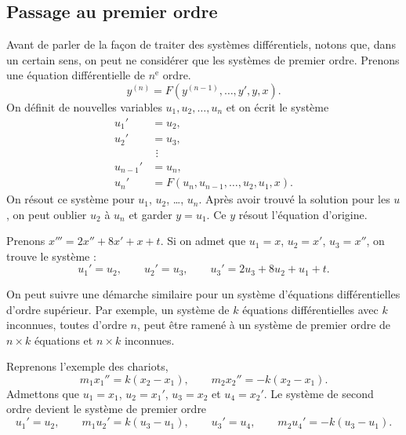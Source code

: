 \subsection{Passage au premier ordre}

Avant de parler de la façon de traiter des systèmes différentiels, notons que, dans un certain sens, on peut ne considérer que les systèmes de premier ordre. Prenons une équation différentielle de $n^{\text{e}}$ ordre.
\begin{equation*}
y^{(n)} = F(y^{(n-1)},\ldots,y',y,x) .
\end{equation*}
On définit de nouvelles variables $u_1, u_2, \ldots, u_n$ et on écrit le système
\begin{align*}
u_1' & = u_2 , \\
u_2' & = u_3 , \\
& ~\, \vdots \\
u_{n-1}' & = u_n , \\
u_n' & = F(u_n,u_{n-1},\ldots,u_2,u_1,x) .
\end{align*}
On résout ce système pour $u_1$, $u_2$, \ldots, $u_n$.  Après avoir trouvé la solution pour les $u$,
on peut oublier $u_2$ à $u_n$ et garder $y = u_1$.
Ce $y$ résout l'équation d'origine.

\begin{example}
Prenons $x''' = 2x''+ 8x' + x + t$.  Si on admet que $u_1 = x$, $u_2 = x'$, $u_3
= x''$, on trouve le système :
\begin{equation*}
u_1' = u_2, \qquad u_2' = u_3, \qquad u_3' = 2u_3 + 8u_2 + u_1 + t .
\end{equation*}
\end{example}

On peut suivre une démarche similaire pour un système d'équations différentielles d'ordre supérieur. Par exemple, un système de $k$ équations différentielles avec $k$
inconnues, toutes d’ordre $n$, peut être ramené à un système de premier ordre de 
$n \times k$
équations et $n \times k$ inconnues.

\begin{example}
Reprenons l’exemple des chariots,
\begin{equation*}
m_1 x_1''  = k(x_2-x_1), \qquad m_2 x_2'' = - k(x_2-x_1) .
\end{equation*}
Admettons que $u_1 = x_1$, $u_2 = x_1'$, 
$u_3 = x_2$ et $u_4 = x_2'$. Le système de second ordre devient le système de premier ordre
\begin{equation*}
u_1' = u_2, \qquad
m_1 u_2'  = k(u_3-u_1), \qquad
u_3' = u_4, \qquad
m_2 u_4' = - k(u_3-u_1) .
\end{equation*}
\end{example}

